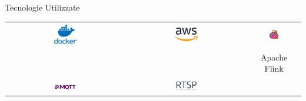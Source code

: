 \documentclass{beamer}
\begin{document}
\begin{frame}{Tecnologie Utilizzate}
    \centering
    \begin{tabular}{ccc}
        \includegraphics[width=0.2\textwidth]{images/docker_logo.png} & 
        \includegraphics[width=0.2\textwidth]{images/aws_logo.png} & 
        \includegraphics[width=0.2\textwidth]{images/apache_flink_logo.jpeg} \\
         	& 	 & Apache Flink \\
        \vspace{0.5cm} \\ %
        \includegraphics[width=0.2\textwidth]{images/mqtt_logo.png} & 
        \includegraphics[width=0.2\textwidth]{images/rtsp_logo.png} \\ 
    \end{tabular}
\end{frame}

\end{document}
